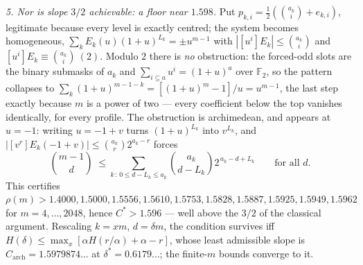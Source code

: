 \documentclass[11pt]{article}
\theoremstyle{remark}
\begin{document}
\emph{5. Nor is slope $3/2$ achievable: a floor near $1.598$.} Put
$p_{k,i}=\tfrac12(\binom{a_k}i+e_{k,i})$, legitimate because every level is
exactly centred; the system becomes homogeneous,
$\sum_kE_k(u)(1+u)^{L_k}=\pm u^{m-1}$ with
$|[u^i]E_k|\le\binom{a_k}i$ and $[u^i]E_k\equiv\binom{a_k}i\ (2)$. Modulo
$2$ there is \emph{no} obstruction: the forced-odd slots are the binary
submasks of $a_k$ and $\sum_{i\subseteq a}u^i=(1+u)^a$ over $\mathbb F_2$,
so the pattern collapses to $\sum_k(1+u)^{m-1-k}=[(1+u)^m-1]/u=u^{m-1}$,
the last step exactly because $m$ is a power of two --- every coefficient
below the top vanishes identically, for every profile. The obstruction is
archimedean, and appears at $u=-1$: writing $u=-1+v$ turns $(1+u)^{L_k}$
into $v^{L_k}$, and $|[v^r]E_k(-1+v)|\le\binom{a_k}r2^{a_k-r}$ forces
\[
\binom{m-1}{d}\;\le\!\!\sum_{k\,:\,0\le d-L_k\le a_k}\!\!
\binom{a_k}{d-L_k}2^{\,a_k-d+L_k}\qquad\text{for all }d .
\]
This certifies $\rho(m)>1.4000,1.5000,1.5556,1.5610,1.5753,1.5828,1.5887,
1.5925,1.5949,1.5962$ for $m=4,\dots,2048$, hence $C^{*}>1.596$ --- well
above the $3/2$ of the classical argument. Rescaling $k=xm$, $d=\delta m$,
the condition survives iff $H(\delta)\le\max_x[\alpha H(r/\alpha)+\alpha-r]$,
whose least admissible slope is $C_{\mathrm{arch}}=1.5979874\ldots$ at
$\delta^{*}=0.6179\ldots$; the finite-$m$ bounds converge to it.
\end{document}
